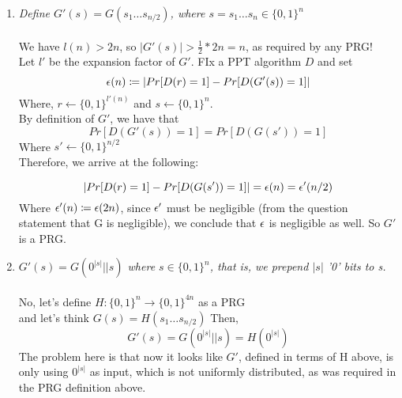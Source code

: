 \documentclass[12pt]{article}
\begin{document}
\begin{enumerate}
\item \emph{Define $G'(s)=G(s_1\dots s_{n/2})$, where $s=s_1\dots s_n \in \{0,1\}^n$}\\\\
We have $l(n) > 2n$, so $|G'(s)| > \frac12*2n=n$, as required by any PRG!\\
Let $l'$ be the expansion factor of $G'$.  FIx a PPT algorithm $D$ and set
\begin{equation*}
\epsilon(n) \coloneqq |Pr[D(r)=1]-Pr[D(G'(s))=1]|
\end{equation*}
Where, $r \leftarrow \{0,1\}^{l'(n)}$ and $s \leftarrow \{0,1\}^n$.\\
By definition of $G'$, we have that
\begin{equation*}
Pr[D(G'(s))=1] = Pr[D(G(s'))=1]
\end{equation*}
Where $s' \leftarrow \{0,1\}^{n/2}$\\
Therefore, we arrive at the following:

\begin{equation*}
|Pr[D(r)=1] - Pr[D(G(s'))=1]| = \epsilon(n) = \epsilon'(n/2)
\end{equation*}
Where $\epsilon'(n) \coloneqq \epsilon(2n)$, since $\epsilon'$ must be negligible (from the question statement that G is negligible), we conclude that $\epsilon$ is negligible as well. So $G'$ is a PRG.
\\
\item \emph{$G'(s)=G(0^{|s|}||s)$ where $s \in \{0,1\}^n$, that is, we prepend $|s|$ '0' bits to s.}\\\\
No, let's define $H: \{0,1\}^n \rightarrow \{0,1\}^{4n}$ as a PRG \\
and let's think $G(s)=H(s_1\dots s_{n/2})$
Then,
\begin{equation*}
G'(s) = G(0^{|s|}||s) = H(0^{|s|})
\end{equation*}
The problem here is that now it looks like $G'$, defined in terms of H above, is only using $0^{|s|}$ as input, which is not uniformly distributed, as was required in the PRG definition above.


\end{enumerate}
\end{document}
